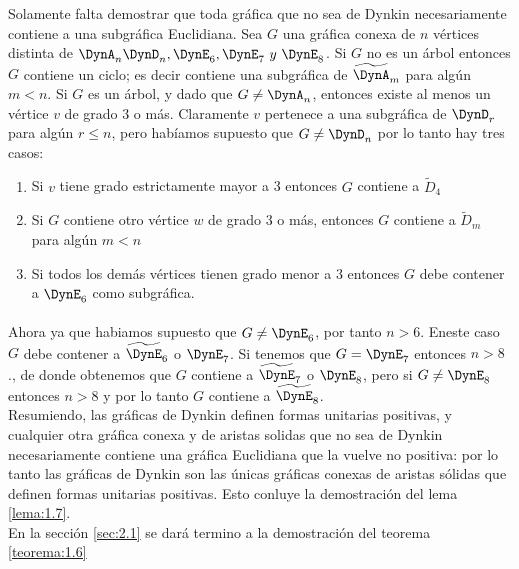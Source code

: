 Solamente falta demostrar que toda gráfica que no sea de Dynkin necesariamente contiene a una subgráfica Euclidiana. Sea $G$ una gráfica conexa de $n$ vértices distinta de $\DynA_{n} \DynD_{n}, \DynE_{6}, \DynE_{7} ~y~ \DynE_{8}$. Si $G$ no es un árbol entonces $G$ contiene un ciclo; es decir contiene una subgráfica de $\widetilde{\DynA}_{m}$ para algún $m < n$. Si $G$ es un árbol, y dado que $G\neq \DynA_{n}$, entonces existe al menos un vértice $v$ de grado 3 o más. Claramente $v$ pertenece a una subgráfica de $\DynD_{r}$ para algún $r \leq n$, pero habíamos supuesto que $G \neq \DynD_{n}$ por lo tanto hay tres casos:

\begin{enumerate}
    \item Si $v$ tiene grado estrictamente mayor a 3 entonces $G$ contiene a $\widetilde{D}_{4}$
    \item Si $G$ contiene otro vértice $w$ de grado 3 o más, entonces $G$ contiene a $\widetilde{D}_{m}$ para algún $m < n$
    \item Si todos los demás vértices tienen grado menor a 3 entonces $G$ debe contener a $\DynE_{6}$ como subgráfica.
\end{enumerate}

\paragraph{}
 Ahora ya que habiamos supuesto que $G \neq \DynE_{6}$, por tanto $n > 6$. Eneste caso $G$ debe contener a $\widetilde{\DynE}_{6}$ o $\DynE_{7}$. Si tenemos que $G = \DynE_{7}$ entonces $n > 8$., de donde obtenemos que $G$ contiene a $\widetilde{\DynE}_{7}$ o $\DynE_{8}$, pero si $G \neq \DynE_{8}$ entonces $n > 8$ y por lo tanto $G$ contiene a $\widetilde{\DynE}_{8}$.\\
Resumiendo, las gráficas de Dynkin definen formas unitarias positivas, y cualquier otra gráfica conexa y de aristas solidas que no sea de Dynkin necesariamente contiene una gráfica Euclidiana que la vuelve no positiva: por lo tanto las gráficas de Dynkin son las únicas gráficas conexas de aristas sólidas que definen formas unitarias positivas. Esto conluye la demostración del lema \ref{lema:1.7}.\\
En la sección \ref{sec:2.1} se dará termino a la demostración del teorema \ref{teorema:1.6}
